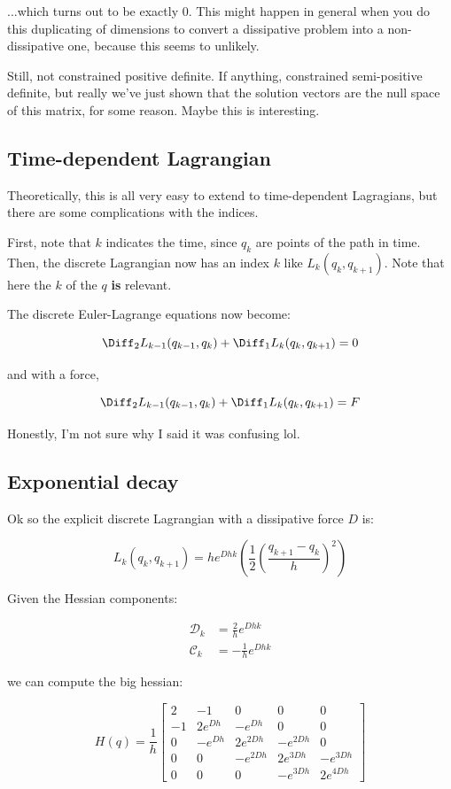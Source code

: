 \documentclass{article}
\begin{document}
...which turns out to be exactly $0$. This might happen in general when you do this duplicating of dimensions to convert a dissipative problem into a non-dissipative one, because this seems to unlikely.

Still, not constrained positive definite. If anything, constrained semi-positive definite, but really we've just shown that the solution vectors are the null space of this matrix, for some reason. Maybe this is interesting.

\subsection{Time-dependent Lagrangian}

Theoretically, this is all very easy to extend to time-dependent Lagragians, but there are some complications with the indices.

First, note that $k$ indicates the time, since $q_k$ are points of the path in time. Then, the discrete Lagrangian now has an index $k$ like $L_k (q_k, q_{k+1})$. Note that here the $k$ of the $q$ \textbf{is} relevant.

The discrete Euler-Lagrange equations now become: 

\[ \Diff_2 L_{k-1} (q_{k-1}, q_k) + \Diff_1 L_k (q_k, q_{k+1}) = 0 \]

and with a force,

\[ \Diff_2 L_{k-1} (q_{k-1}, q_k) + \Diff_1 L_k (q_k, q_{k+1}) = F \]

Honestly, I'm not sure why I said it was confusing lol.

\subsection{Exponential decay}

Ok so the explicit discrete Lagrangian with a dissipative force $D$ is:

\[
    L_k(q_k, q_{k+1}) = h e^{D h k} \left(\frac{1}{2} \left(\frac{q_{k+1} - q_k}{h}\right)^2\right)
\]

Given the Hessian components:

\begin{align*}    
    \mathcal{D}_k &= \frac{2}{h} e^{D h k} \\
    \mathcal{C}_k &= - \frac{1}{h} e^{D h k}
\end{align*}

we can compute the big hessian:

\[
    H(q) = \frac{1}{h} \left[\begin{matrix}2 & -1 & 0 & 0 & 0\\-1 & 2 e^{D h} & - e^{D h} & 0 & 0\\0 & - e^{D h} & 2 e^{2 D h} & - e^{2 D h} & 0\\0 & 0 & - e^{2 D h} & 2 e^{3 D h} & - e^{3 D h}\\0 & 0 & 0 & - e^{3 D h} & 2 e^{4 D h}\end{matrix}\right]
\]
\end{document}
